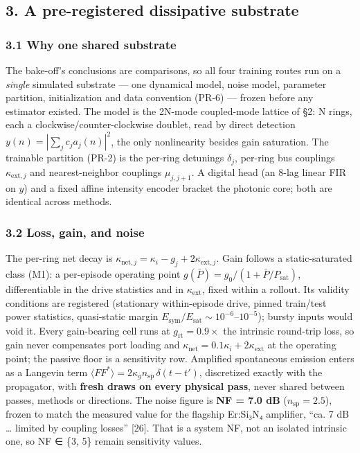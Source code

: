 \documentclass[
  10pt,
]{article}
\begin{document}
\subsection{3. A pre-registered dissipative
substrate}\label{a-pre-registered-dissipative-substrate}

\subsubsection{3.1 Why one shared
substrate}\label{why-one-shared-substrate}

The bake-off's conclusions are comparisons, so all four training routes
run on a \emph{single} simulated substrate --- one dynamical model,
noise model, parameter partition, initialization and data convention
(PR-6) --- frozen before any estimator existed. The model is the 2N-mode
coupled-mode lattice of §2: N rings, each a clockwise/counter-clockwise
doublet, read by direct detection \(y(n) = |\sum_j c_j a_j(n)|^2\), the
only nonlinearity besides gain saturation. The trainable partition
(PR-2) is the per-ring detunings \(\delta_j\), per-ring bus couplings
\(\kappa_{\text{ext},j}\) and nearest-neighbor couplings
\(\mu_{j,j+1}\). A digital head (an 8-lag linear FIR on \(y\)) and a
fixed affine intensity encoder bracket the photonic core; both are
identical across methods.

\subsubsection{3.2 Loss, gain, and noise}\label{loss-gain-and-noise}

The per-ring net decay is
\(\kappa_{\text{net},j} = \kappa_i - g_j + 2\kappa_{\text{ext},j}\).
Gain follows a static-saturated class (M1): a per-episode operating
point \(g(\bar P) =
g_0/(1+\bar P/P_\text{sat})\), differentiable in the drive statistics
and in \(\kappa_\text{ext}\), fixed within a rollout. Its validity
conditions are registered (stationary within-episode drive, pinned
train/test power statistics, quasi-static margin
\(E_\text{sym}/E_\text{sat} \sim
10^{-6}\)--\(10^{-5}\)); bursty inputs would void it. Every gain-bearing
cell runs at \(g_\text{rt} = 0.9\times\) the intrinsic round-trip loss,
so gain never compensates port loading and
\(\kappa_\text{net} = 0.1\kappa_i + 2\kappa_\text{ext}\) at the
operating point; the passive floor is a sensitivity row. Amplified
spontaneous emission enters as a Langevin term
\(\langle FF^*\rangle = 2\kappa_g n_\text{sp}\,\delta(t{-}t')\),
discretized exactly with the propagator, with \textbf{fresh draws on
every physical pass}, never shared between passes, methods or
directions. The noise figure is \textbf{NF = 7.0 dB}
(\(n_\text{sp}=2.5\)), frozen to match the measured value for the
flagship Er:Si₃N₄ amplifier, ``ca. 7 dB \ldots{} limited by coupling
losses'' {[}26{]}. That is a system NF, not an isolated intrinsic one,
so NF ∈ \{3, 5\} remain sensitivity values.
\end{document}
